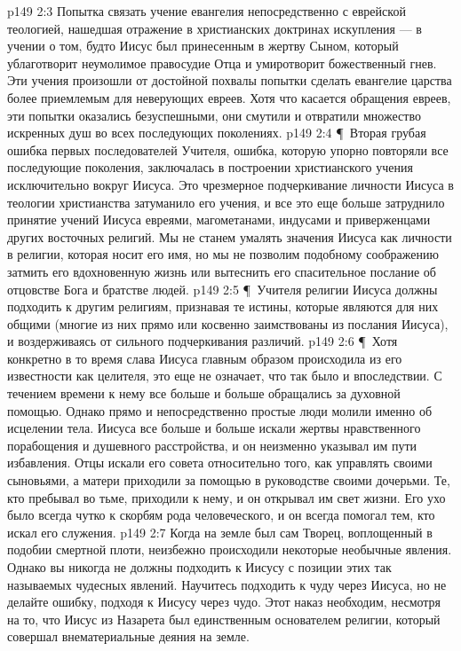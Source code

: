 \vs p149 2:3 \bibnobreakspace Попытка связать учение евангелия непосредственно с еврейской теологией, нашедшая отражение в христианских доктринах искупления --- в учении о том, будто Иисус был принесенным в жертву Сыном, который ублаготворит неумолимое правосудие Отца и умиротворит божественный гнев. Эти учения произошли от достойной похвалы попытки сделать евангелие царства более приемлемым для неверующих евреев. Хотя что касается обращения евреев, эти попытки оказались безуспешными, они смутили и отвратили множество искренных душ во всех последующих поколениях.
\vs p149 2:4 \P\ \bibnobreakspace Вторая грубая ошибка первых последователей Учителя, ошибка, которую упорно повторяли все последующие поколения, заключалась в построении христианского учения исключительно вокруг  Иисуса. Это чрезмерное подчеркивание личности Иисуса в теологии христианства затуманило его учения, и все это еще больше затруднило принятие учений Иисуса евреями, магометанами, индусами и приверженцами других восточных религий. Мы не станем умалять значения Иисуса как личности в религии, которая носит его имя, но мы не позволим подобному соображению затмить его вдохновенную жизнь или вытеснить его спасительное послание об отцовстве Бога и братстве людей.
\vs p149 2:5 \P\ Учителя религии Иисуса должны подходить к другим религиям, признавая те истины, которые являются для них общими (многие из них прямо или косвенно заимствованы из послания Иисуса), и воздерживаясь от сильного подчеркивания различий.
\vs p149 2:6 \P\ Хотя конкретно в то время слава Иисуса главным образом происходила из его известности как целителя, это еще не означает, что так было и впоследствии. С течением времени к нему все больше и больше обращались за духовной помощью. Однако прямо и непосредственно простые люди молили именно об исцелении тела. Иисуса все больше и больше искали жертвы нравственного порабощения и душевного расстройства, и он неизменно указывал им пути избавления. Отцы искали его совета относительно того, как управлять своими сыновьями, а матери приходили за помощью в руководстве своими дочерьми. Те, кто пребывал во тьме, приходили к нему, и он открывал им свет жизни. Его ухо было всегда чутко к скорбям рода человеческого, и он всегда помогал тем, кто искал его служения.
\vs p149 2:7 Когда на земле был сам Творец, воплощенный в подобии смертной плоти, неизбежно происходили некоторые необычные явления. Однако вы никогда не должны подходить к Иисусу с позиции этих так называемых чудесных явлений. Научитесь подходить к чуду через Иисуса, но не делайте ошибку, подходя к Иисусу через чудо. Этот наказ необходим, несмотря на то, что Иисус из Назарета был единственным основателем религии, который совершал внематериальные деяния на земле.
